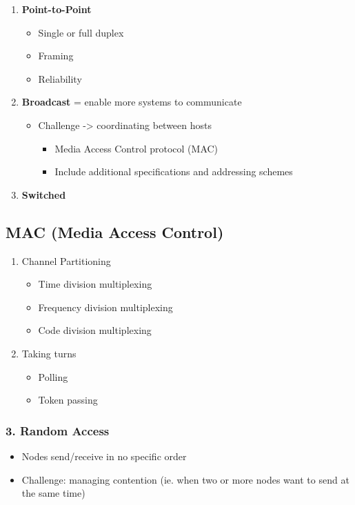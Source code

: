 \documentclass[11pt]{article}
\begin{document}
\begin{enumerate}
\item \textbf{Point-to-Point}
\begin{itemize}
\item Single or full duplex
\item Framing
\item Reliability
\end{itemize}
\item \textbf{Broadcast} = enable more systems to communicate
\begin{itemize}
\item Challenge -> coordinating between hosts
\begin{itemize}
\item Media Access Control protocol (MAC)
\item Include additional specifications and addressing schemes
\end{itemize}
\end{itemize}
\item \textbf{Switched}
\end{enumerate}

\subsection{MAC (Media Access Control)}
\label{sec:orgheadline34}
\begin{enumerate}
\item Channel Partitioning
\begin{itemize}
\item Time division multiplexing
\item Frequency division multiplexing
\item Code division multiplexing
\end{itemize}

\item Taking turns
\begin{itemize}
\item Polling
\item Token passing
\end{itemize}
\end{enumerate}

\subsubsection{3. Random Access}
\label{sec:orgheadline33}
\begin{itemize}
\item Nodes send/receive in no specific order
\item Challenge: managing contention (ie. when two or more nodes want to send at
the same time)
\end{itemize}
\end{document}

